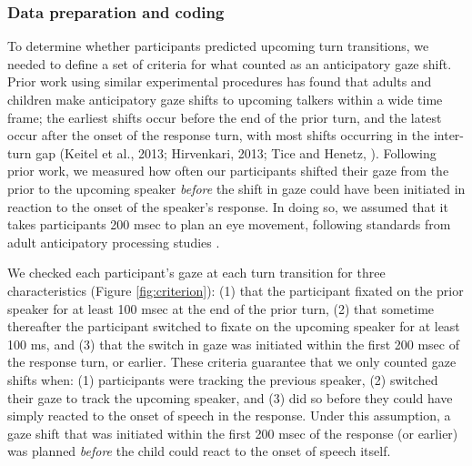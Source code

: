 \documentclass[authoryear, 12pt]{elsarticle}
\begin{document}
\subsubsection{Data preparation and coding}
\label{sec:algorithm}

To determine whether participants predicted upcoming turn transitions, we needed to define a set of criteria for what counted as an anticipatory gaze shift. Prior work using similar experimental procedures has found that adults and children make anticipatory gaze shifts to upcoming talkers within a wide time frame; the earliest shifts occur before the end of the prior turn, and the latest occur after the onset of the response turn, with most shifts occurring in the inter-turn gap (Keitel et al., 2013; Hirvenkari, 2013; Tice and Henetz, \citeyear{TiceHenetz11}). Following prior work, we measured how often our participants shifted their gaze from the prior to the upcoming speaker \textit{before} the shift in gaze could have been initiated in reaction to the onset of the speaker's response. In doing so, we assumed that it takes participants 200 msec to plan an eye movement, following standards from adult anticipatory processing studies \citep[e.g., ][]{kamide2003}.

We checked each participant's gaze at each turn transition for three characteristics (Figure \ref{fig:criterion}): (1) that the participant fixated on the prior speaker for at least 100 msec at the end of the prior turn, (2) that sometime thereafter the participant switched to fixate on the upcoming speaker for at least 100 ms, and (3) that the switch in gaze was initiated within the first 200 msec of the response turn, or earlier. These criteria guarantee that we only counted gaze shifts when: (1) participants were tracking the previous speaker, (2) switched their gaze to track the upcoming speaker, and (3) did so before they could have simply reacted to the onset of speech in the response. Under this assumption, a gaze shift that was initiated within the first 200 msec of the response (or earlier) was planned \textit{before} the child could react to the onset of speech itself. 
\end{document}

